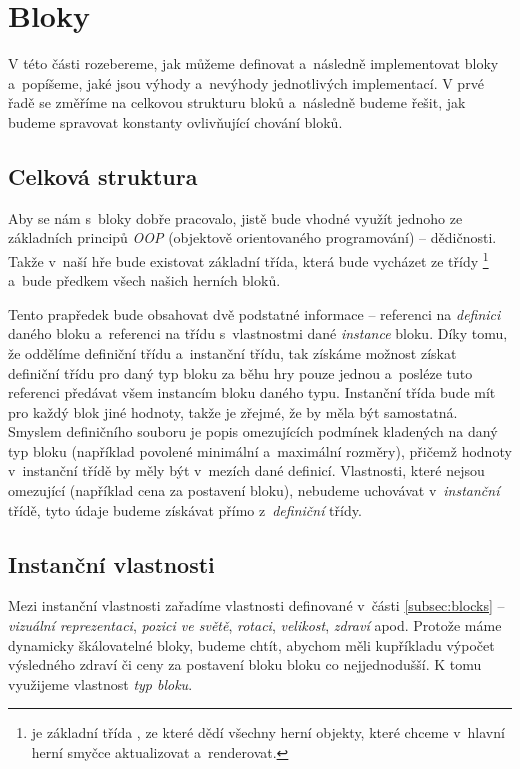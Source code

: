 
\section{Bloky}

V této části rozebereme, jak můžeme definovat a~následně implementovat bloky a~popíšeme, jaké jsou výhody a~nevýhody jednotlivých implementací. V prvé řadě se změříme na celkovou strukturu bloků a~následně budeme řešit, jak budeme spravovat konstanty ovlivňující chování bloků.

\subsection{Celková struktura}

Aby se nám s~bloky dobře pracovalo, jistě bude vhodné využít jednoho ze základních principů \textit{OOP} (objektově orientovaného programování) -- dědičnosti. Takže v~naší hře bude existovat základní třída, která bude vycházet ze třídy \footnote{ je základní třída \UEu{}, ze které dědí všechny herní objekty, které chceme v~hlavní herní smyčce aktualizovat a~renderovat.} a~bude předkem všech našich herních bloků.

Tento prapředek bude obsahovat dvě podstatné informace -- referenci na \textit{definici} daného bloku a~referenci na třídu s~vlastnostmi dané \textit{instance} bloku. Díky tomu, že oddělíme definiční třídu a~instanční třídu, tak získáme možnost získat definiční třídu pro daný typ bloku za běhu hry pouze jednou a~posléze tuto referenci předávat všem instancím bloku daného typu. Instanční třída bude mít pro každý blok jiné hodnoty, takže je zřejmé, že by měla být samostatná. Smyslem definičního souboru je popis omezujících podmínek kladených na daný typ bloku (například povolené minimální a~maximální rozměry), přičemž hodnoty v~instanční třídě by měly být v~mezích dané definicí. Vlastnosti, které nejsou omezující (například cena za postavení bloku), nebudeme uchovávat v~\textit{instanční} třídě, tyto údaje budeme získávat přímo z~\textit{definiční} třídy.

\subsection{Instanční vlastnosti}
\label{subsec:instVlast}
Mezi instanční vlastnosti zařadíme vlastnosti definované v~části \ref{subsec:blocks} --  \textit{vizuální reprezentaci}, \textit{pozici ve světě}, \textit{rotaci}, \textit{velikost}, \textit{zdraví} apod. Protože máme dynamicky škálovatelné bloky, budeme chtít, abychom měli kupříkladu výpočet výsledného zdraví či ceny za postavení bloku bloku co nejjednodušší. K tomu využijeme vlastnost \textit{typ bloku}.

